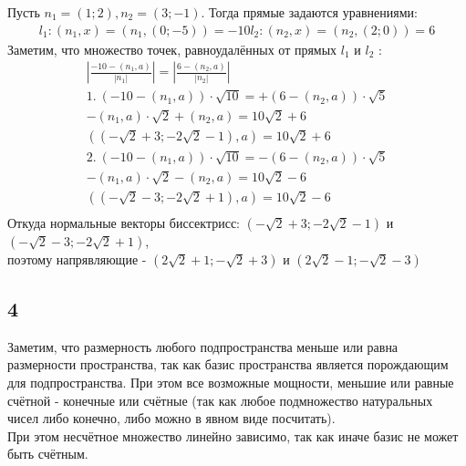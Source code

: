 		Пусть $n_1 = (1;2), n_2 = (3;-1)$. Тогда прямые задаются уравнениями:
		\begin{gather*}
			l_1 : (n_1,x) = (n_1,(0;-5)) = -10
			l_2 : (n_2,x) = (n_2,(2;0)) = 6
		\end{gather*}
		Заметим, что множество точек, равноудалённых от прямых $l_1$ и $l_2$ :
		\begin{gather*}
			|\frac{-10 - (n_1, a)}{|n_1|}| = |\frac{6 - (n_2, a)}{|n_2|}|\\
			1. \ (-10 - (n_1,a)) \cdot \sqrt{10} = +(6 - (n_2,a)) \cdot \sqrt{5}\\
			-(n_1,a) \cdot \sqrt{2} + (n_2,a) = 10\sqrt{2} + 6\\
			((-\sqrt{2} + 3;-2\sqrt{2} - 1),a) = 10\sqrt{2} + 6\\
			2. \ (-10 - (n_1,a)) \cdot \sqrt{10} = -(6 - (n_2,a)) \cdot \sqrt{5}\\
			-(n_1,a) \cdot \sqrt{2} - (n_2,a) = 10\sqrt{2} - 6\\
			((-\sqrt{2} - 3;-2\sqrt{2} + 1),a) = 10\sqrt{2} - 6\\
		\end{gather*}
		Откуда нормальные векторы биссектрисс: $(-\sqrt{2} + 3;-2\sqrt{2} - 1)$ и $(-\sqrt{2} - 3;-2\sqrt{2} + 1)$,\\
		поэтому напрявляющие - $(2\sqrt{2} + 1;-\sqrt{2} + 3)$ и $(2\sqrt{2} - 1;-\sqrt{2} - 3)$
		
		\subsection{4}
		Заметим, что размерность любого подпространства меньше или равна размерности пространства, так как базис пространства является порождающим для подпространства. При этом все возможные мощности, меньшие или равные счётной - конечные или счётные (так как любое подмножество натуральных чисел либо конечно, либо можно в явном виде посчитать).\\
		При этом несчётное множество линейно зависимо, так как иначе базис не может быть счётным.
		
